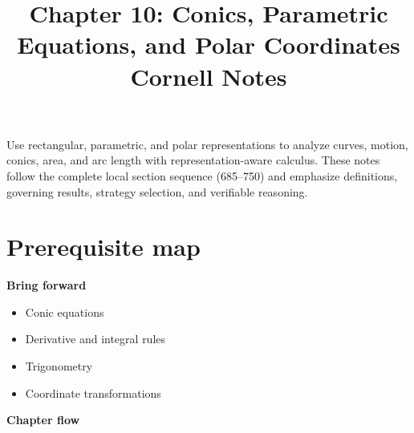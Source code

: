 \documentclass[11pt]{article}
\title{Chapter 10: Conics, Parametric Equations, and Polar Coordinates\\[2mm]\large Cornell Notes}
\author{}
\date{}
\begin{document}
\maketitle
\thispagestyle{fancy}
\begin{orientationbox}
Use rectangular, parametric, and polar representations to analyze curves, motion, conics, area, and arc length with representation-aware calculus. These notes follow the complete local section sequence (685--750) and emphasize definitions, governing results, strategy selection, and verifiable reasoning.
\end{orientationbox}

\section{Prerequisite map}
\begin{minipage}[t]{0.42\textwidth}
\textbf{Bring forward}
\begin{itemize}
\item Conic equations
\item Derivative and integral rules
\item Trigonometry
\item Coordinate transformations
\end{itemize}
\end{minipage}\hfill
\begin{minipage}[t]{0.54\textwidth}
\textbf{Chapter flow}
\begin{center}
\end{center}
\end{minipage}
\end{document}
